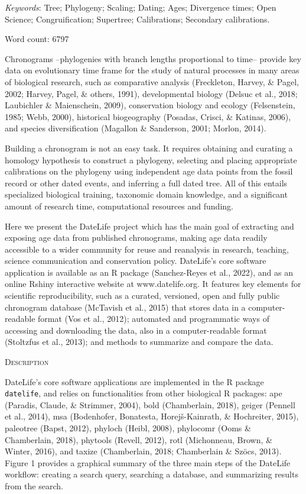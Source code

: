 \documentclass[english,man]{apa6}
\begin{document}
\emph{Keywords}: Tree; Phylogeny; Scaling; Dating; Ages; Divergence times; Open Science; Congruification; Supertree; Calibrations; Secondary calibrations.

Word count: 6797

\newpage

Chronograms --phylogenies with branch lengths proportional to time-- provide key data on evolutionary time frame for the study of natural processes in many areas of biological research, such as comparative analysis (Freckleton, Harvey, \& Pagel, 2002; Harvey, Pagel, \& others, 1991), developmental biology (Delsuc et al., 2018; Laubichler \& Maienschein, 2009), conservation biology and ecology (Felsenstein, 1985; Webb, 2000), historical biogeography (Posadas, Crisci, \& Katinas, 2006), and species diversification (Magallon \& Sanderson, 2001; Morlon, 2014).

Building a chronogram is not an easy task.
It requires obtaining and curating a homology hypothesis to construct a phylogeny, selecting and placing appropriate calibrations on the phylogeny using independent age data points from the fossil record or other dated events, and inferring a full dated tree. All of this entails specialized biological training, taxonomic domain knowledge, and a significant amount of research time, computational resources and funding.

Here we present the DateLife project which has the main goal of extracting and exposing age data from published chronograms, making age data readily accessible to a wider community for reuse and reanalysis in research, teaching, science communication and conservation policy.
DateLife's core software application is available as an R package (Sanchez-Reyes et al., 2022), and as an online Rshiny interactive website at www.datelife.org. It features key elements for scientific reproducibility, such as a curated, versioned, open and fully public chronogram database (McTavish et al., 2015) that stores data in a computer-readable format (Vos et al., 2012); automated and programmatic ways of accessing and downloading the data, also in a computer-readable format (Stoltzfus et al., 2013); and methods to summarize and compare the data.

\begin{center}
\textsc{Description}
\end{center}

DateLife's core software applications are implemented in the R package \texttt{datelife},
and relies on functionalities from other biological R packages:
ape (Paradis, Claude, \& Strimmer, 2004),
bold (Chamberlain, 2018),
geiger (Pennell et al., 2014),
msa (Bodenhofer, Bonatesta, Horejš-Kainrath, \& Hochreiter, 2015),
paleotree (Bapst, 2012),
phyloch (Heibl, 2008),
phylocomr (Ooms \& Chamberlain, 2018),
phytools (Revell, 2012),
rotl (Michonneau, Brown, \& Winter, 2016), and
taxize (Chamberlain, 2018; Chamberlain \& Szöcs, 2013).
Figure 1 provides a graphical summary of the three main steps of the DateLife workflow: creating a search query, searching a database, and summarizing results from the search.
\end{document}
